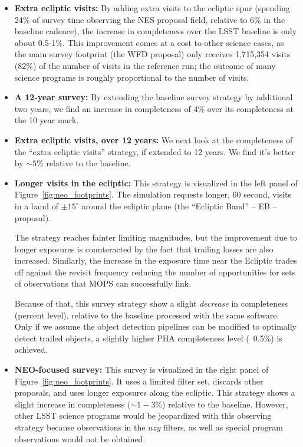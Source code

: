 \begin{itemize}
\item \textbf{Extra ecliptic visits:} By adding extra visits to the ecliptic spur (spending 24\% of survey time observing the NES proposal field, relative to 6\% in the baseline cadence), the increase in completeness over the LSST baseline is only about 0.5-1\%. This improvement comes at a cost to other science cases, as the main survey footprint (the WFD proposal) only receives 1,715,354 visits (82\%) of the number of visits in the reference run; the outcome of many science programs is roughly proportional to the number of visits.

\item \textbf{A 12-year survey:} By extending the baseline survey strategy by additional two years, we find an increase in completeness of 4\% over its completeness at the 10 year mark.

\item \textbf{Extra ecliptic visits, over 12 years:} We next look at the completeness of the ``extra ecliptic visits'' strategy, if extended to 12 years. We find it's better by $\sim 5$\% relative to the baseline.

\item \textbf{Longer visits in the ecliptic:} This strategy is visualized in the left panel of Figure~\ref{fig:neo_footprints}. The simulation requests longer, 60 second, visits in a band of $\pm 15^\circ$ around the ecliptic plane (the ``Ecliptic Band'' -- EB -- proposal).

The strategy reaches fainter limiting magnitudes, but the improvement due to longer exposures is counteracted by the fact that trailing losses are also increased. Similarly, the increase in the exposure time near the Ecliptic trades off against the revisit frequency reducing the number of opportunities for sets of observations that MOPS can successfully link. 

Because of that, this survey strategy show a slight {\em decrease} in completeness (percent level), relative to the baseline processed with the same software. Only if we assume the object detection pipelines can be modified to optimally detect trailed objects, a slightly higher PHA completeness level (~0.5\%) is achieved.

\item \textbf{NEO-focused survey:} This survey is visualized in the right panel of Figure~\ref{fig:neo_footprints}. It uses a limited filter set, discards other proposals, and uses longer exposures along the ecliptic. This strategy shows a slight increase in completeness ($\sim1-3$\%) relative to the baseline.
However, other LSST science programs would be jeopardized with this observing strategy because observations in the $uzy$ filters,
as well as special program observations would not be obtained.
\end{itemize}

